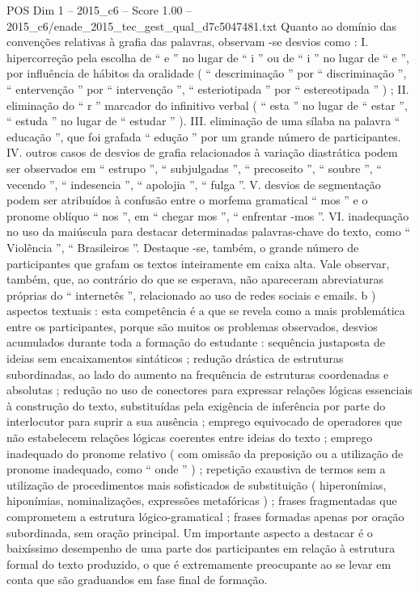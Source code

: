 \begin{textsample}{POS Dim 1 – 2015\_c6 – Score 1.00 – 2015\_c6/enade\_2015\_tec\_gest\_qual\_d7c5047481.txt}
Quanto ao domínio das convenções relativas à grafia das palavras, observam -se desvios como : I. hipercorreção pela escolha de “ e ” no lugar de “ i ” ou de “ i ” no lugar de “ e ”, por influência de hábitos da oralidade ( “ descriminação ” por “ discriminação ”, “ entervenção ” por “ intervenção ”, “ esteriotipada ” por “ estereotipada ” ) ; II. eliminação do “ r ” marcador do infinitivo verbal ( “ esta ” no lugar de “ estar ”, “ estuda ” no lugar de “ estudar ” ).
III. eliminação de uma sílaba na palavra “ educação ”, que foi grafada “ edução ” por um grande número de participantes.
IV. outros casos de desvios de grafia relacionados à variação diastrática podem ser observados em “ estrupo ”, “ subjulgadas ”, “ precoseito ”, “ soubre ”, “ vecendo ”, “ indesencia ”, “ apolojia ”, “ fulga ”.
V. desvios de segmentação podem ser atribuídos à confusão entre o morfema gramatical “ mos ” e o pronome oblíquo “ nos ”, em “ chegar mos ”, “ enfrentar -mos ”.
VI. inadequação no uso da maiúscula para destacar determinadas palavras-chave do texto, como “ Violência ”, “ Brasileiros ”.
Destaque -se, também, o grande número de participantes que grafam os textos inteiramente em caixa alta.
Vale observar, também, que, ao contrário do que se esperava, não apareceram abreviaturas próprias do “ internetês ”, relacionado ao uso de redes sociais e emails. b ) aspectos textuais : esta competência é a que se revela como a mais problemática entre os participantes, porque são muitos os problemas observados, desvios acumulados durante toda a formação do estudante : sequência justaposta de ideias sem encaixamentos sintáticos ; redução drástica de estruturas subordinadas, ao lado do aumento na frequência de estruturas coordenadas e absolutas ; redução no uso de conectores para expressar relações lógicas essenciais à construção do texto, substituídas pela exigência de inferência por parte do interlocutor para suprir a sua ausência ; emprego equivocado de operadores que não estabelecem relações lógicas coerentes entre ideias do texto ; emprego inadequado do pronome relativo ( com omissão da preposição ou a utilização de pronome inadequado, como “ onde ” ) ; repetição exaustiva de termos sem a utilização de procedimentos mais sofisticados de substituição ( hiperonímias, hiponímias, nominalizações, expressões metafóricas ) ; frases fragmentadas que comprometem a estrutura lógico-gramatical ; frases formadas apenas por oração subordinada, sem oração principal.
Um importante aspecto a destacar é o baixíssimo desempenho de uma parte dos participantes em relação à estrutura formal do texto produzido, o que é extremamente preocupante ao se levar em conta que são graduandos em fase final de formação.

\end{textsample}
